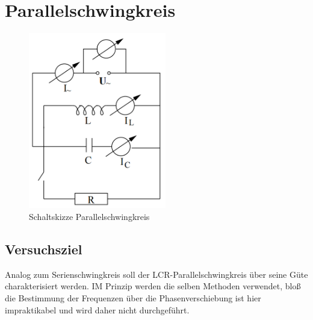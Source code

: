 \documentclass[a4paper, 11pt]{article}
\begin{document}
\newpage

\section{Parallelschwingkreis}
\begin{figure}[H]
	\centering
	\includegraphics[trim = 0mm 0mm 0mm 0mm,clip, width=6cm]{Bilder/Parallelschwingkreis_Schaltskizze.png}%
	\caption[Schaltskizze Parallelschwingkreis]{Schaltskizze Parallelschwingkreis}%
	\label{pic:Abbildung 2}%
\end{figure}

\subsection{Versuchsziel}
Analog zum Serienschwingkreis soll der LCR-Parallelschwingkreis über seine Güte charakterisiert werden. IM Prinzip werden die selben Methoden verwendet, bloß die Bestimmung der Frequenzen über die Phasenverschiebung ist hier impraktikabel und wird daher nicht durchgeführt.
\end{document}
